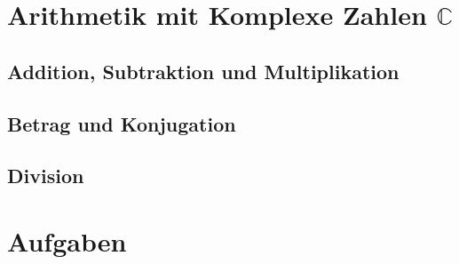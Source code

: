 \documentclass{article}
\begin{document}
    \large  

    \section{Arithmetik mit Komplexe Zahlen $\mathbb{C}$}

    \subsection{Addition, Subtraktion und Multiplikation}

    

    \subsection{Betrag und Konjugation}

    \begin{figure}[!htb]
        \centering
        \qquad
    \end{figure}

    \subsection{Division}

    

    \section{Aufgaben}
    
    
\end{document}
